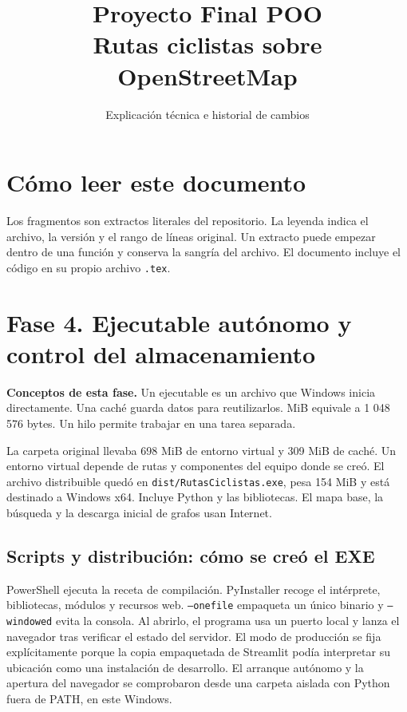 \documentclass[11pt,a4paper]{article}
\title{Proyecto Final POO\\Rutas ciclistas sobre OpenStreetMap}
\author{Explicación técnica e historial de cambios}
\date{}
\begin{document}
\maketitle
\tableofcontents
\clearpage

\section*{Cómo leer este documento}
Los fragmentos son extractos literales del repositorio. La leyenda indica
el archivo, la versión y el rango de líneas original. Un extracto puede
empezar dentro de una función y conserva la sangría del archivo. El documento
incluye el código en su propio archivo \texttt{.tex}.

\section{Fase 4. Ejecutable autónomo y control del almacenamiento}

\textbf{Conceptos de esta fase.} Un ejecutable es un archivo que Windows inicia directamente. Una caché guarda datos para reutilizarlos. MiB equivale a 1 048 576 bytes. Un hilo permite trabajar en una tarea separada.

La carpeta original llevaba 698 MiB de entorno virtual y 309 MiB de caché. Un entorno virtual depende de rutas y componentes del equipo donde se creó. El archivo distribuible quedó en \texttt{dist/RutasCiclistas.exe}, pesa 154 MiB y está destinado a Windows x64. Incluye Python y las bibliotecas. El mapa base, la búsqueda y la descarga inicial de grafos usan Internet.

\subsection{Scripts y distribución: cómo se creó el EXE}
PowerShell ejecuta la receta de compilación. PyInstaller recoge el intérprete, bibliotecas, módulos y recursos web. \texttt{--onefile} empaqueta un único binario y \texttt{--windowed} evita la consola. Al abrirlo, el programa usa un puerto local y lanza el navegador tras verificar el estado del servidor. El modo de producción se fija explícitamente porque la copia empaquetada de Streamlit podía interpretar su ubicación como una instalación de desarrollo. El arranque autónomo y la apertura del navegador se comprobaron desde una carpeta aislada con Python fuera de PATH, en este Windows.
\end{document}
